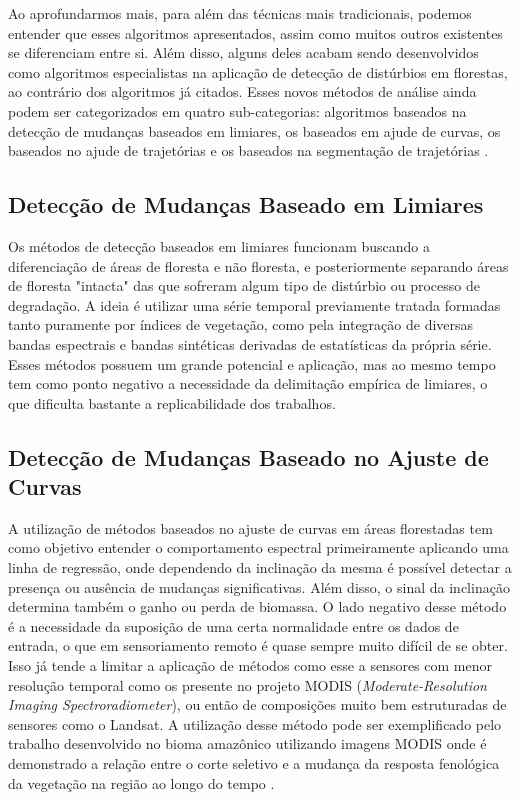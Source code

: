 \documentclass[12pt,a4paper]{article}
\begin{document}
Ao aprofundarmos mais, para além das técnicas mais tradicionais, podemos entender que esses algoritmos apresentados, assim como muitos outros existentes se diferenciam entre si. Além disso, alguns deles acabam sendo desenvolvidos como algoritmos especialistas na aplicação de detecção de distúrbios em florestas, ao contrário dos algoritmos já citados. Esses novos métodos de análise ainda podem ser categorizados em quatro sub-categorias: algoritmos baseados na detecção de mudanças baseados em limiares, os baseados em ajude de curvas, os baseados no ajude de trajetórias e os baseados na segmentação de trajetórias \citep{Banskota2014, Hirschmugl2017}.

\subsection{Detecção de Mudanças Baseado em Limiares}
Os métodos de detecção baseados em limiares funcionam buscando a diferenciação de áreas de floresta e não floresta, e posteriormente separando áreas de floresta "intacta" das que sofreram algum tipo de distúrbio ou processo de degradação. A ideia é utilizar uma série temporal previamente tratada formadas tanto puramente por índices de vegetação, como pela integração de diversas bandas espectrais e bandas sintéticas derivadas de estatísticas da própria série. Esses métodos possuem um grande potencial e aplicação, mas ao mesmo tempo tem como ponto negativo a necessidade da delimitação empírica de limiares, o que dificulta bastante a replicabilidade dos trabalhos.

\subsection{Detecção de Mudanças Baseado no Ajuste de Curvas}
A utilização de métodos baseados no ajuste de curvas em áreas florestadas tem como objetivo entender o comportamento espectral primeiramente aplicando uma linha de regressão, onde dependendo da inclinação da mesma é possível detectar a presença ou ausência de mudanças significativas. Além disso, o sinal da inclinação determina também o ganho ou perda de biomassa. O lado negativo desse método é a necessidade da suposição de uma certa normalidade entre os dados de entrada, o que em sensoriamento remoto é quase sempre muito difícil de se obter. Isso já tende a limitar a aplicação de métodos como esse a sensores com menor resolução temporal como os presente no projeto MODIS (\textit{Moderate-Resolution Imaging Spectroradiometer}), ou então de composições muito bem estruturadas de sensores como o Landsat. A utilização desse método pode ser exemplificado pelo trabalho desenvolvido no bioma amazônico utilizando imagens MODIS onde é demonstrado a relação entre o corte seletivo e a mudança da resposta fenológica da vegetação na região ao longo do tempo \citep{KOLTUNOV20092431}.
\end{document}
